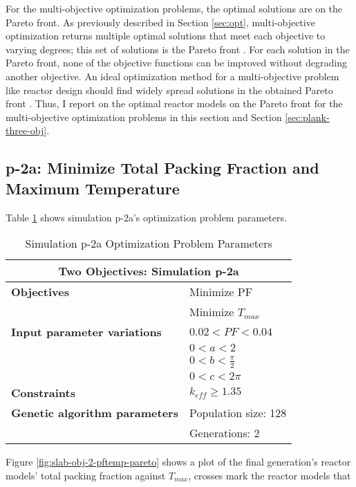 For the multi-objective optimization problems, the optimal solutions are on the 
Pareto front. 
As previously described in Section \ref{sec:opt}, multi-objective optimization returns 
multiple optimal solutions that meet each objective to varying degrees; this set of 
solutions is the Pareto front \cite{deb_multi-objective_2001}. 
For each solution in the Pareto front, none of the objective functions can be 
improved without degrading another objective.
An ideal optimization method for a multi-objective problem like reactor design 
should find widely spread solutions in the obtained Pareto front 
\cite{deb_multi-objective_2001}. 
Thus, I report on the optimal reactor models on the Pareto front for the multi-objective 
optimization problems in this section and Section \ref{sec:plank-three-obj}. 

\subsection{p-2a: Minimize Total Packing Fraction and Maximum Temperature}
\label{sec:p-2a}
Table \ref{tab:simulationp2a} shows simulation p-2a's optimization problem parameters. 
\begin{table}[htbp]
    \centering
    \onehalfspacing
    \caption{Simulation p-2a Optimization Problem Parameters}
	\label{tab:simulationp2a}
    \footnotesize
    \begin{tabular}{l|p{4cm}}
    \hline 
    \multicolumn{2}{c}{\textbf{Two Objectives: Simulation p-2a}} \\
    \hline 
    \textbf{Objectives} & Minimize PF \\
    & Minimize $T_{max}$ \\
    \hline 
    \textbf{Input parameter variations} & $0.02<PF<0.04$ \\
    & $0<a<2$ \\
    & $0<b<\frac{\pi}{2}$ \\
    & $0<c<2\pi$ \\
    \hline
    \textbf{Constraints} & $k_{eff} \geq 1.35$\\ 
    \hline 
    \textbf{Genetic algorithm parameters} & Population size: 128 \\
    & Generations: 2 \\
    \hline
    \end{tabular}
\end{table}
Figure \ref{fig:slab-obj-2-pftemp-pareto} shows a plot of the final generation's reactor 
models' total packing fraction against $T_{max}$, crosses mark the reactor models that 
